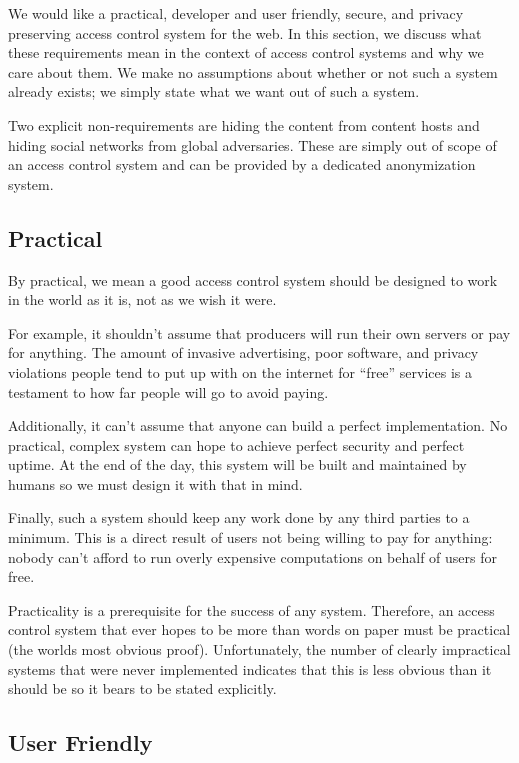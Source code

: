 \documentclass[pdftex,12pt,a4papaer,twoside,notitlepage]{report}
\begin{document}
We would like a practical, developer and user friendly, secure, and privacy
preserving access control system for the web. In this section, we discuss what
these requirements mean in the context of access control systems and why we care
about them. We make no assumptions about whether or not such a system already
exists; we simply state what we want out of such a system.

Two explicit non-requirements are hiding the content from content hosts and
hiding social networks from global adversaries. These are simply out of scope of
an access control system and can be provided by a dedicated anonymization system.

\subsection{Practical}

By practical, we mean a good access control system should be designed to work in
the world as it is, not as we wish it were.

For example, it shouldn't assume that producers will run their own servers or
pay for anything. The amount of invasive advertising, poor software, and privacy
violations people tend to put up with on the internet for ``free'' services is a
testament to how far people will go to avoid paying.

Additionally, it can't assume that anyone can build a perfect implementation. No
practical, complex system can hope to achieve perfect security and perfect
uptime. At the end of the day, this system will be built and maintained by
humans so we must design it with that in mind.

Finally, such a system should keep any work done by any third parties to a
minimum. This is a direct result of users not being willing to pay for anything:
nobody can't afford to run overly expensive computations on behalf of users for
free.

Practicality is a prerequisite for the success of any system. Therefore, an
access control system that ever hopes to be more than words on paper must be
practical (the worlds most obvious proof). Unfortunately, the number of clearly
impractical systems that were never implemented indicates that this is less
obvious than it should be so it bears to be stated explicitly.

\subsection{User Friendly}
\label{sub:goal-user}
\end{document}
